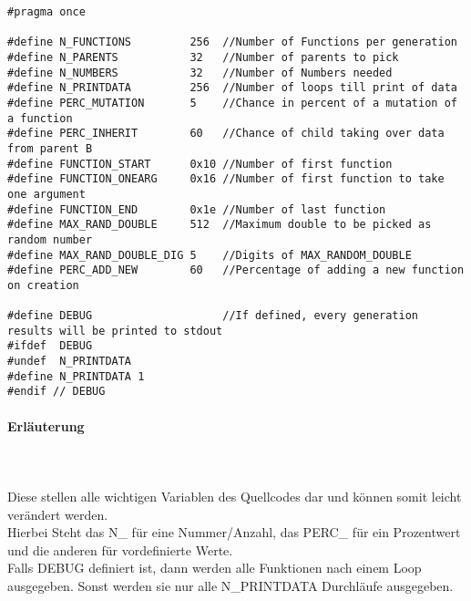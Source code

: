 \documentclass[a4paper,12pt]{article}
\begin{document}
\begin{verbatim}
#pragma once

#define N_FUNCTIONS         256  //Number of Functions per generation
#define N_PARENTS           32   //Number of parents to pick
#define N_NUMBERS           32   //Number of Numbers needed
#define N_PRINTDATA         256  //Number of loops till print of data
#define PERC_MUTATION       5    //Chance in percent of a mutation of a function
#define PERC_INHERIT        60   //Chance of child taking over data from parent B
#define FUNCTION_START      0x10 //Number of first function
#define FUNCTION_ONEARG     0x16 //Number of first function to take one argument
#define FUNCTION_END        0x1e //Number of last function
#define MAX_RAND_DOUBLE     512  //Maximum double to be picked as random number
#define MAX_RAND_DOUBLE_DIG 5    //Digits of MAX_RANDOM_DOUBLE
#define PERC_ADD_NEW        60   //Percentage of adding a new function on creation

#define DEBUG                    //If defined, every generation results will be printed to stdout
#ifdef  DEBUG
#undef  N_PRINTDATA
#define N_PRINTDATA 1
#endif // DEBUG
\end{verbatim}
\newpage
\paragraph{Erläuterung}\hfill\\\\
Diese stellen alle wichtigen Variablen des Quellcodes dar und können somit leicht verändert werden.\\ Hierbei Steht das N\_ für eine Nummer/Anzahl, das PERC\_ für ein Prozentwert und die anderen für vordefinierte Werte. \\
Falls DEBUG definiert ist, dann werden alle Funktionen nach einem Loop ausgegeben. Sonst werden sie nur alle N\_PRINTDATA Durchläufe ausgegeben. \\
\end{document}
